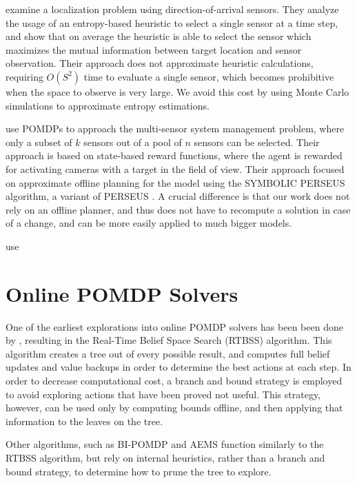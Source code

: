 \citet{cit:relworkentropy} examine a localization problem using direction-of-arrival sensors. They
analyze the usage of an entropy-based heuristic to select a single sensor at a time step, and show
that on average the heuristic is able to select the sensor which maximizes the mutual information
between target location and sensor observation. Their approach does not approximate heuristic
calculations, requiring $O(S^2)$ time to evaluate a single sensor, which becomes prohibitive when
the space to observe is very large. We avoid this cost by using Monte Carlo simulations to
approximate entropy estimations.

\citet{cit:relworkspaan} use POMDPs to approach the multi-sensor system management problem, where
only a subset of $k$ sensors out of a pool of $n$ sensors can be selected. Their approach is based
on state-based reward functions, where the agent is rewarded for activating cameras with a target in
the field of view. Their approach focused on approximate offline planning for the model using
the SYMBOLIC PERSEUS algorithm, a variant of PERSEUS \cite{cit:perseus}. A crucial difference
is that our work does not rely on an offline planner, and thus does not have to recompute a solution
in case of a change, and can be more easily applied to much bigger models.

\citet{cit:relworksatsangi} use 

\section{Online POMDP Solvers}

One of the earliest explorations into online POMDP solvers has been been done by
\citet{cit:relworkonline1}, resulting in the Real-Time Belief Space Search (RTBSS) algorithm. This
algorithm creates a tree out of every possible result, and computes full belief updates and value
backups in order to determine the best actions at each step. In order to decrease computational
cost, a branch and bound strategy is employed to avoid exploring actions that have been proved not
useful. This strategy, however, can be used only by computing bounds offline, and then applying that
information to the leaves on the tree.

Other algorithms, such as BI-POMDP \cite{cit:relworkonlinebi} and AEMS \cite{cit:relworkonlineaems}
function similarly to the RTBSS algorithm, but rely on internal heuristics, rather than a branch and
bound strategy, to determine how to prune the tree to explore.

